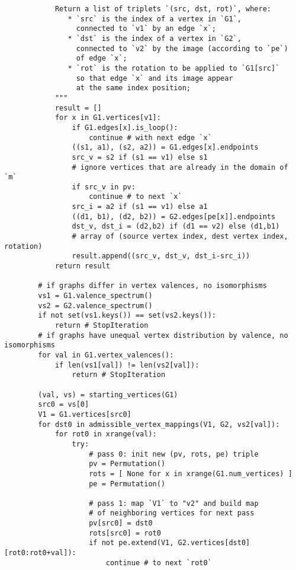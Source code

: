 \begin{lstlisting}
            Return a list of triplets `(src, dst, rot)`, where:
               * `src` is the index of a vertex in `G1`,
                 connected to `v1` by an edge `x`;
               * `dst` is the index of a vertex in `G2`,
                 connected to `v2` by the image (according to `pe`)
                 of edge `x`;
               * `rot` is the rotation to be applied to `G1[src]`
                 so that edge `x` and its image appear
                 at the same index position;
            """
            result = []
            for x in G1.vertices[v1]:
                if G1.edges[x].is_loop():
                    continue # with next edge `x`
                ((s1, a1), (s2, a2)) = G1.edges[x].endpoints
                src_v = s2 if (s1 == v1) else s1
                # ignore vertices that are already in the domain of `m`
                if src_v in pv:
                    continue # to next `x`
                src_i = a2 if (s1 == v1) else a1
                ((d1, b1), (d2, b2)) = G2.edges[pe[x]].endpoints
                dst_v, dst_i = (d2,b2) if (d1 == v2) else (d1,b1)
                # array of (source vertex index, dest vertex index, rotation)
                result.append((src_v, dst_v, dst_i-src_i))
            return result
            
        # if graphs differ in vertex valences, no isomorphisms
        vs1 = G1.valence_spectrum()
        vs2 = G2.valence_spectrum()
        if not set(vs1.keys()) == set(vs2.keys()):
            return # StopIteration
        # if graphs have unequal vertex distribution by valence, no isomorphisms
        for val in G1.vertex_valences():
            if len(vs1[val]) != len(vs2[val]):
                return # StopIteration

        (val, vs) = starting_vertices(G1)
        src0 = vs[0]
        V1 = G1.vertices[src0]
        for dst0 in admissible_vertex_mappings(V1, G2, vs2[val]):
            for rot0 in xrange(val):
                try:
                    # pass 0: init new (pv, rots, pe) triple
                    pv = Permutation()
                    rots = [ None for x in xrange(G1.num_vertices) ]
                    pe = Permutation()

                    # pass 1: map `V1` to "v2" and build map
                    # of neighboring vertices for next pass
                    pv[src0] = dst0
                    rots[src0] = rot0
                    if not pe.extend(V1, G2.vertices[dst0][rot0:rot0+val]):
                        continue # to next `rot0`


\end{lstlisting}
